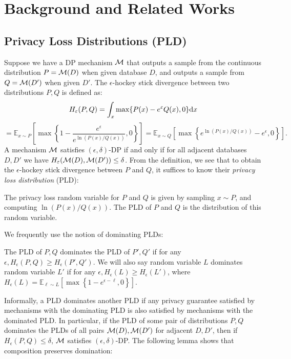 \section{Background and Related Works}

\subsection{Privacy Loss Distributions (PLD)}

Suppose we have a DP mechanism $\mathcal{M}$ that outputs a sample from the continuous distribution $P = \mathcal{M}(D)$ when given database $D$, and outputs a sample from $Q = \mathcal{M}(D')$ when given $D'$. The $\epsilon$-hockey stick divergence between two distributions $P, Q$ is defined as:
%
\[H_\varepsilon(P, Q) = \int_x \max\{P(x) - e^\varepsilon Q(x), 0\} \text{d} x\]
\[= \mathbb{E}_{x \sim P}\left[\max\left\{1 -\frac{e^\epsilon}{e^{\ln(P(x)/Q(x))}}, 0\right\}\right] = \mathbb{E}_{x \sim Q}\left[\max\left\{e^{\ln(P(x)/Q(x))} - e^\epsilon, 0\right\}\right].\]
%
A mechanism $\mathcal{M}$ satisfies $(\epsilon, \delta)$-DP if and only if for all adjacent databases $D, D'$ we have $H_\varepsilon(\mathcal{M}(D), \mathcal{M}(D')) \leq \delta$. From the definition, we see that to obtain the $\epsilon$-hockey stick divergence between $P$ and $Q$, it suffices to know their \textit{privacy loss distribution} (PLD):

\begin{definition}
The privacy loss random variable for $P$ and $Q$ is given by sampling $x \sim P$, and computing $\ln(P(x)/Q(x))$. The PLD of $P$ and $Q$ is the distribution of this random variable. 
\end{definition}
%
We frequently use the notion of dominating PLDs:
%
\begin{definition}
The PLD of $P, Q$ dominates the PLD of $P', Q'$ if for any $\epsilon, H_\epsilon(P, Q) \geq H_\epsilon(P', Q')$. We will also say random variable $L$ dominates random variable $L'$ if for any $\epsilon, H_\epsilon(L) \geq H_\epsilon(L')$, where $H_\epsilon(L) = \mathbb{E}_{\ell \sim L}\left[\max\left\{1 - e^{\epsilon - \ell}, 0\right\}\right]$.
\end{definition}

Informally, a PLD dominates another PLD if any privacy guarantee satisfied by mechanisms with the dominating PLD is also satisfied by mechanisms with the dominated PLD. In particular, if the PLD of some pair of distributions $P, Q$ dominates the PLDs of all pairs $\mathcal{M}(D), \mathcal{M}(D')$ for adjacent $D, D'$, then if $H_\epsilon(P, Q) \leq \delta$, $\mathcal{M}$ satisfies $(\epsilon, \delta)$-DP. The following lemma shows that composition preserves domination:


